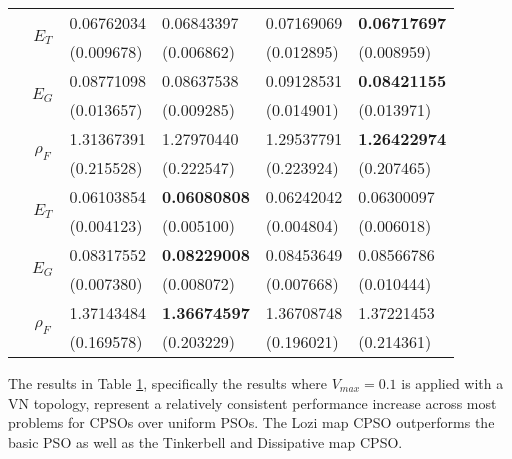 \documentclass[conference]{IEEEtran}
\begin{document}
\begin{table}[htbp]
\begin{center}
\begin{tabular}{|c|c|l|l|l|l|}
\hline
\parbox[t]{2mm}{}
& 
& 0.06762034 & 0.06843397 & 0.07169069 & \textbf{0.06717697}\\
& & (0.009678) & (0.006862) & (0.012895) & (0.008959)\\
&  
& 0.08771098 & 0.08637538 & 0.09128531 & \textbf{0.08421155}\\
& & (0.013657) & (0.009285) & (0.014901) & (0.013971)\\
&  
& 1.31367391 & 1.27970440 & 1.29537791 & \textbf{1.26422974}\\
& & (0.215528) & (0.222547) & (0.223924) & (0.207465)\\
\hline
\parbox[t]{2mm}{}
& 
& 0.06103854 & \textbf{0.06080808} & 0.06242042 & 0.06300097\\
& & (0.004123) & (0.005100) & (0.004804) & (0.006018)\\
&  
& 0.08317552 & \textbf{0.08229008} & 0.08453649 & 0.08566786\\
& & (0.007380) & (0.008072) & (0.007668) & (0.010444)\\
&  
& 1.37143484 & \textbf{1.36674597} & 1.36708748 & 1.37221453\\
& & (0.169578) & (0.203229) & (0.196021) & (0.214361)\\
\hline
\end{tabular}
\label{tab:glass}
\end{center}
\end{table}

The results in Table \ref{tab:glass}, specifically the results where $ V_{max} = 0.1$ is applied with a \ac{VN} topology, represent a relatively consistent performance increase across most problems for \ac{CPSO}s over uniform \ac{PSO}s. The Lozi map \ac{CPSO} outperforms the basic \ac{PSO} as well as the Tinkerbell and Dissipative map \ac{CPSO}.
\end{document}
